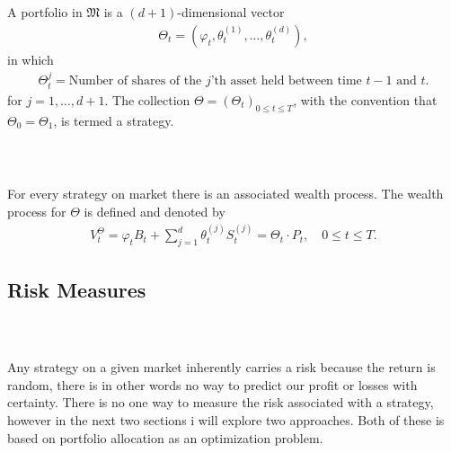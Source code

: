 \documentclass{beamer}
\numberwithin{equation}{section}
\begin{document}
\begin{frame}\frametitle{{\normalsize \secname} \\ {\large \subsecname}}
    \begin{definition}
        A portfolio in $\mathfrak{M}$ is a $(d + 1)$-dimensional vector
        \begin{align}
            \Theta_t = \left(\varphi_t, \theta_t^{(1)}, \ldots, \theta_t^{(d)}\right),
        \end{align}
        in which
        \begin{align}
            \Theta_t^j = \text{Number of shares of the $j$'th asset held between time $t-1$ and $t$}.
        \end{align}
        for $j = 1, \ldots, d + 1$.
        The collection $\Theta = \left( \Theta_t \right)_{0 \leq t \leq T}$, with the convention that $\Theta_0 = \Theta_1$, is termed a strategy.
    \end{definition}
\end{frame}

\begin{frame}\frametitle{{\normalsize \secname} \\ {\large \subsecname}}
    For every strategy on market there is an associated wealth process.
    The wealth process for $\Theta$ is defined and denoted by
    \begin{align}
        V_t^{\Theta} = \varphi_t B_t + \sum_{j = 1}^d \theta_t^{(j)} S_t^{(j)} = \Theta_t \cdot P_t, \quad 0 \leq t \leq T.
    \end{align}
\end{frame}

\subsection{Risk Measures}

\begin{frame}\frametitle{{\normalsize \secname} \\ {\large \subsecname}}
    Any strategy on a given market inherently carries a risk because the return is random, there is in other words no way to predict our profit or losses with certainty.
    There is no one way to measure the risk associated with a strategy, however in the next two sections i will explore two approaches.
    Both of these is based on portfolio allocation as an optimization problem.
\end{frame}
\end{document}
